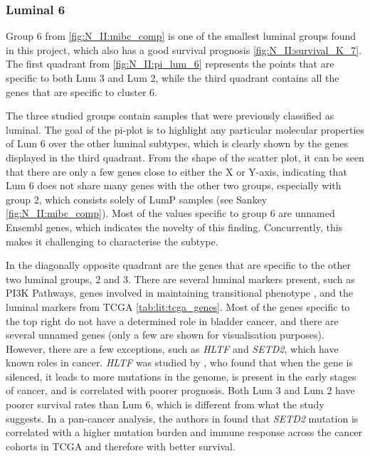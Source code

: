 \subsubsection*{Luminal 6} \label{s:N_II:lum_6}

Group 6 from \cref{fig:N_II:mibc_comp} is one of the smallest luminal groups found in this project, which also has a good survival prognosis \cref{fig:N_II:survival_K_7}. The first quadrant from \cref{fig:N_II:pi_lum_6}  represents the points that are specific to both Lum 3 and Lum 2, while the third quadrant contains all the genes that are specific to cluster 6. 

The three studied groups contain samples that were previously classified as luminal. The goal of the pi-plot is to highlight any particular molecular properties of Lum 6 over the other luminal subtypes, which is clearly shown by the genes displayed in the third quadrant. From the shape of the scatter plot, it can be seen that there are only a few genes close to either the X or Y-axis, indicating that Lum 6 does not share many genes with the other two groups, especially with group 2, which consists solely of LumP samples (see Sankey \cref{fig:N_II:mibc_comp}). Most of the values specific to group 6 are unnamed Ensembl genes, which indicates the novelty of this finding. Concurrently, this makes it challenging to characterise the subtype.

In the diagonally opposite quadrant are the genes that are specific to the other two luminal groups, 2 and 3. There are several luminal markers present, such as PI3K Pathways, genes involved in maintaining transitional phenotype \citep{Hurst2022-sp}, and the luminal markers from TCGA \cref{tab:lit:tcga_genes}. Most of the genes specific to the top right do not have a determined role in bladder cancer, and there are several unnamed genes (only a few are shown for visualisation purposes). However, there are a few exceptions, such as \textit{HLTF} and \textit{SETD2}, which have known roles in cancer. \textit{HLTF} was studied by \citep{Dhont2016-vf}, who found that when the gene is silenced, it leads to more mutations in the genome, is present in the early stages of cancer, and is correlated with poorer prognosis. Both Lum 3 and Lum 2 have poorer survival rates than Lum 6, which is different from what the study suggests. In a pan-cancer analysis, the authors in \citep{Lu2021-jt} found that \textit{SETD2} mutation is correlated with a higher mutation burden and immune response across the cancer cohorts in TCGA and therefore with better survival.

